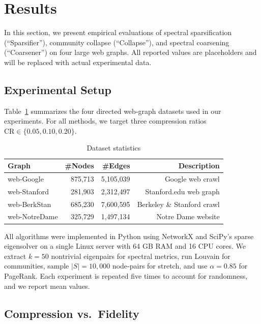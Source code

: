 \section{Results}
\label{sec:results}

In this section, we present empirical evaluations of spectral sparsification (``Sparsifier''), community collapse (``Collapse''), and spectral coarsening (``Coarsener'') on four large web graphs.  All reported values are placeholders and will be replaced with actual experimental data.

\subsection{Experimental Setup}

Table~\ref{tab:datasets} summarizes the four directed web‐graph datasets used in our experiments.  For all methods, we target three compression ratios \(\mathrm{CR}\in\{0.05, 0.10, 0.20\}\).

\begin{table}[h]
  \centering
  \caption{Dataset statistics}
  \label{tab:datasets}
  \begin{tabular}{lrrr}
    \toprule
    Graph            & \#Nodes   & \#Edges   & Description \\
    \midrule
    web‐Google       & 875{,}713 & 5{,}105{,}039 & Google web crawl \\
    web‐Stanford     & 281{,}903 & 2{,}312{,}497 & Stanford.edu web graph \\
    web‐BerkStan     & 685{,}230 & 7{,}600{,}595 & Berkeley \& Stanford crawl \\
    web‐NotreDame    & 325{,}729 & 1{,}497{,}134 & Notre Dame website \\
    \bottomrule
  \end{tabular}
\end{table}

All algorithms were implemented in Python using NetworkX and SciPy's sparse eigensolver on a single Linux server with 64 GB RAM and 16 CPU cores.  We extract \(k=50\) nontrivial eigenpairs for spectral metrics, run Louvain for communities, sample \(|S|=10{,}000\) node‐pairs for stretch, and use \(\alpha=0.85\) for PageRank.  Each experiment is repeated five times to account for randomness, and we report mean values.

\subsection{Compression vs.\ Fidelity}

